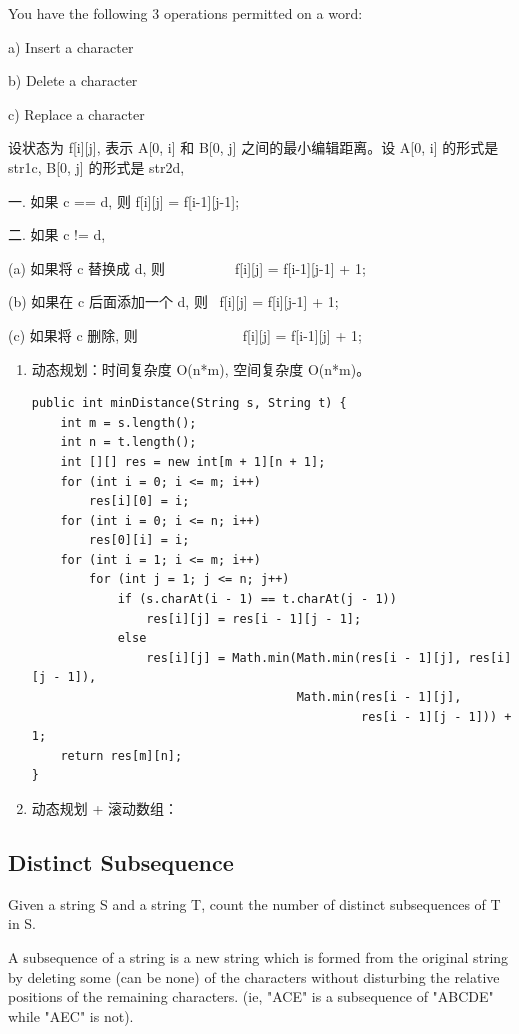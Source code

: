 \documentclass[12pt]{book}
\begin{document}
You have the following 3 operations permitted on a word:

a) Insert a character

b) Delete a character

c) Replace a character

设状态为 f[i][j], 表示 A[0, i] 和 B[0, j] 之间的最小编辑距离。设 A[0, i] 的形式是 str1c, B[0, j] 的形式是 str2d, 

一. 如果 c == d, 则 f[i][j] = f[i-1][j-1];

二. 如果 c != d,

(a) 如果将 c 替换成 d, 则~ ~ ~ ~ ~ ~ f[i][j] = f[i-1][j-1] + 1;

(b) 如果在 c 后面添加一个 d, 则~ f[i][j] = f[i][j-1] + 1;

(c) 如果将 c 删除, 则~ ~ ~ ~ ~ ~ ~ ~ ~ f[i][j] = f[i-1][j] + 1;

\begin{enumerate}
\item 动态规划：时间复杂度 O(n*m), 空间复杂度 O(n*m)。
\label{sec-14-3-3-1}
\lstset{language=java,label= ,caption= ,numbers=none}
\begin{lstlisting}
public int minDistance(String s, String t) {
    int m = s.length();
    int n = t.length();
    int [][] res = new int[m + 1][n + 1];
    for (int i = 0; i <= m; i++)
        res[i][0] = i;
    for (int i = 0; i <= n; i++)
        res[0][i] = i;
    for (int i = 1; i <= m; i++) 
        for (int j = 1; j <= n; j++) 
            if (s.charAt(i - 1) == t.charAt(j - 1))
                res[i][j] = res[i - 1][j - 1];
            else 
                res[i][j] = Math.min(Math.min(res[i - 1][j], res[i][j - 1]),
                                     Math.min(res[i - 1][j],
                                              res[i - 1][j - 1])) + 1;
    return res[m][n];
}
\end{lstlisting}
\item 动态规划 + 滚动数组：
\label{sec-14-3-3-2}
\end{enumerate}

\subsection{Distinct Subsequence}
\label{sec-14-3-4}
Given a string S and a string T, count the number of distinct subsequences of T in S.

A subsequence of a string is a new string which is formed from the original string by deleting some (can be none) of the characters without disturbing the relative positions of the remaining characters. (ie, "ACE" is a subsequence of "ABCDE" while "AEC" is not).
\end{document}
